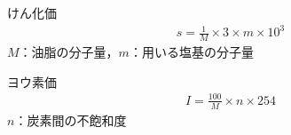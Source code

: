 \begin{enumerate}[label=$\cdot$]
\begin{enumerate}[label=$-$]
\begin{itembox}[l]{けん化価}
        \begin{gather*}
          s = \frac{1}{M} \times 3 \times m \times 10^3
        \end{gather*}
      \quad$M$：油脂の分子量，$m$：用いる塩基の分子量
      \baselineskip
    \end{itembox}
    \begin{itembox}[l]{ヨウ素価}
        \begin{gather*}
          I = \frac{100}{M} \times n \times 254
        \end{gather*}
      \quad$n$：炭素間の不飽和度
      \baselineskip
    \end{itembox}
  \end{enumerate} 
\end{enumerate}



